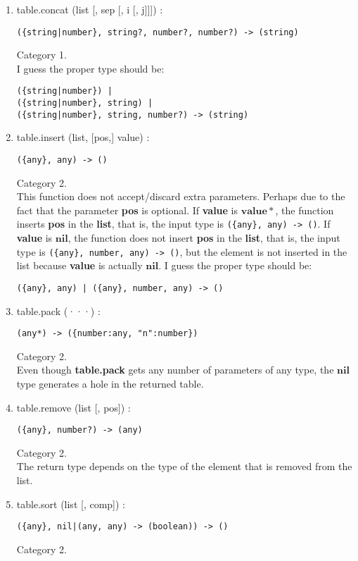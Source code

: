\documentclass{paper}
\newcommand{\Value}{\mathbf{value}}
\newcommand{\Nil}{\mathbf{nil}}
\begin{document}
\begin{enumerate}
\item table.concat (list [, sep [, i [, j]]]) :
\begin{verbatim}
({string|number}, string?, number?, number?) -> (string)
\end{verbatim}
Category 1.
\\
I guess the proper type should be:
\begin{verbatim}
({string|number}) |
({string|number}, string) |
({string|number}, string, number?) -> (string)
\end{verbatim}
\item table.insert (list, [pos,] value) :
\begin{verbatim}
({any}, any) -> ()
\end{verbatim}
Category 2.
\\
This function does not accept/discard extra parameters.
Perhaps due to the fact that the parameter \textbf{pos} is optional.
If \textbf{value} is $\Value{*}$, the function inserts \textbf{pos}
in the \textbf{list}, that is, the input type is
\texttt{(\{any\}, any) -> ()}.
If \textbf{value} is $\Nil$, the function does not insert \textbf{pos}
in the \textbf{list}, that is, the input type is
\texttt{(\{any\}, number, any) -> ()},
but the element is not inserted in the list because \textbf{value}
is actually $\Nil$.
I guess the proper type should be:
\begin{verbatim}
({any}, any) | ({any}, number, any) -> ()
\end{verbatim}
\item table.pack (···) :
\begin{verbatim}
(any*) -> ({number:any, "n":number})
\end{verbatim}
Category 2.
\\
Even though \textbf{table.pack} gets any number of parameters of
any type, the $\Nil$ type generates a hole in the returned table.
\item table.remove (list [, pos]) :
\begin{verbatim}
({any}, number?) -> (any)
\end{verbatim}
Category 2.
\\
The return type depends on the type of the element that is removed
from the list.
\item table.sort (list [, comp]) :
\begin{verbatim}
({any}, nil|(any, any) -> (boolean)) -> ()
\end{verbatim}
Category 2.
\\

\end{enumerate}
\end{document}
